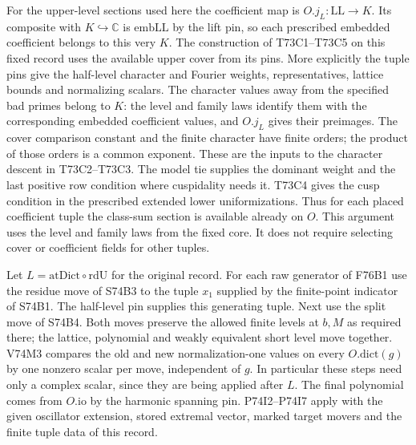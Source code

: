 For the upper-level sections used here the coefficient map is
$O.j_L:\mathrm{LL}\to K$. Its composite with $K\hookrightarrow
\mathbb C$ is $\mathrm{embLL}$ by the lift pin, so each prescribed
embedded coefficient belongs to this very $K$. The construction
of T73C1--T73C5 on this fixed record uses the available upper
cover from its pins. More explicitly the tuple pins give the
half-level character and Fourier weights, representatives, lattice
bounds and normalizing scalars. The character values away from
the specified bad primes belong to $K$: the level and family
laws identify them with the corresponding embedded coefficient
values, and $O.j_L$ gives their preimages. The cover comparison
constant and the finite character have finite orders; the product
of those orders is a common exponent. These are the inputs to
the character descent in T73C2--T73C3. The model tie supplies
the dominant weight and the last positive row condition where
cuspidality needs it. T73C4 gives the cusp condition in the
prescribed extended lower uniformizations. Thus for each
placed coefficient tuple the class-sum section is available
already on $O$. This argument uses the level and family laws
from the fixed core. It does not require selecting cover or
coefficient fields for other tuples.

Let $L=\mathrm{atDict}\circ\mathrm{rdU}$ for the original record.
For each raw generator of F76B1 use the residue move of S74B3 to
the tuple $x_1$ supplied by the finite-point indicator of S74B1.
The half-level pin supplies this generating tuple. Next use the
split move of S74B4. Both moves preserve the allowed finite levels
at $b,M$ as required there; the lattice, polynomial and weakly
equivalent short level move together. V74M3 compares the old and
new normalization-one values on every $O.\mathrm{dict}(g)$ by
one nonzero scalar per move, independent of $g$. In particular
these steps need only a complex scalar, since they are being
applied after $L$. The final polynomial comes from $O.\mathrm{io}$
by the harmonic spanning pin. P74I2--P74I7 apply with the
given oscillator extension, stored extremal vector, marked target
movers and the finite tuple data of this record.

